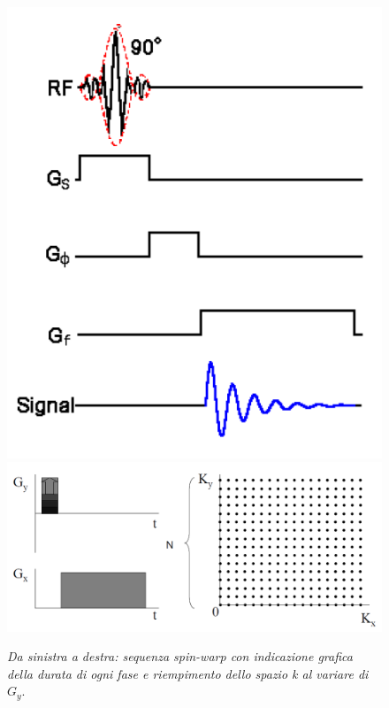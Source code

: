 \documentclass{report}
\numberwithin{equation}{section}
\numberwithin{figure}{section}
\begin{document}
\vspace{- 7 pt}
\begin{figure}[htp]
\centering
\includegraphics[scale=0.5]{immagini/sw.png}\quad\includegraphics[scale=0.5]{immagini/k.png}
\caption{\label{fig:k} \textit{Da sinistra a destra: sequenza spin-warp con indicazione grafica della durata di ogni fase e riempimento dello spazio k al variare di $G_y$}.}
\end{figure}

\vspace{-12 pt}
\end{document}
